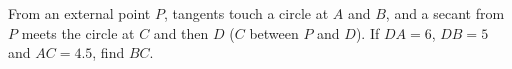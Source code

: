 From an external point $P$, tangents touch a circle at $A$ and $B$, and a secant from $P$ meets the circle at $C$ and then $D$ ($C$ between $P$ and $D$). If $DA=6$, $DB=5$ and $AC=4.5$, find $BC$.
